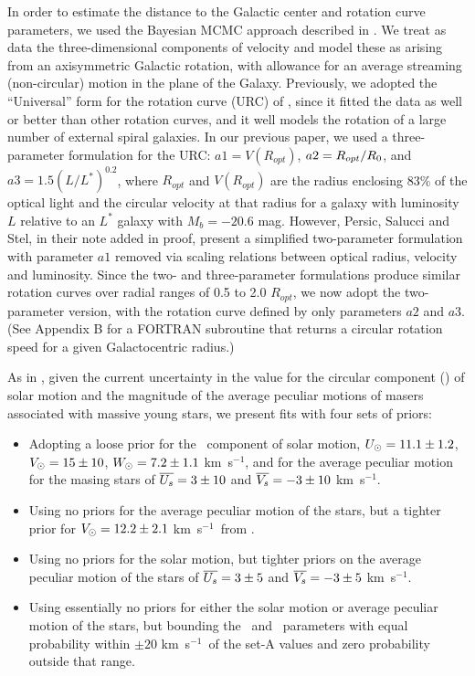 \documentclass[12pt,preprint]{aastex}
\def\kms  {km~s$^{-1}$}
\def\V     {\ifmmode {V_\odot}\else {$V_\odot$}\fi}
\def\U     {\ifmmode {U_\odot}\else {$U_\odot$}\fi}
\def\W     {\ifmmode {W_\odot}\else {$W_\odot$}\fi}
\def\Vsbar {\ifmmode {\overline{V_s}}\else {$\overline{V_s}$}\fi}
\def\Usbar {\ifmmode {\overline{U_s}}\else {$\overline{U_s}$}\fi}
\def\Ro    {\ifmmode{R_0}\else{$R_0$}\fi}
\begin{document}
In order to estimate the distance to the Galactic center and rotation curve
parameters, we used the Bayesian MCMC approach described in \citet{Reid:14}.
We treat as data the three-dimensional components of velocity and model these
as arising from an axisymmetric Galactic rotation, with allowance for an
average streaming (non-circular) motion in the plane of the Galaxy.  
Previously, we adopted the ``Universal'' form for the rotation curve (URC) 
of \citet{Persic:96}, since it fitted the data as well or better than other 
rotation curves, and it well models the rotation of a large number of external 
spiral galaxies.  In our previous paper, we used a three-parameter formulation 
for the URC: $a1=V(R_{opt})$, $a2=R_{opt}/\Ro$, and $a3=1.5(L/L^*)^{0.2}$,
where $R_{opt}$ and $V(R_{opt})$ are the radius  enclosing 83\% of the optical light
and the circular velocity at that radius for a galaxy with luminosity $L$ relative 
to an $L^*$ galaxy with $M_b = -20.6$ mag.  However, Persic, Salucci and Stel, in their 
note added in proof, present a simplified two-parameter formulation with 
parameter $a1$ removed via scaling relations between optical radius, velocity 
and luminosity.  Since the two- and three-parameter formulations produce similar 
rotation curves over radial ranges of 0.5 to 2.0 $R_{opt}$, we now adopt the 
two-parameter version, with the rotation curve defined by only parameters $a2$ 
and $a3$.  (See Appendix B for a {\footnotesize FORTRAN} subroutine that
returns a circular rotation speed for a given Galactocentric radius.)

As in \citet{Reid:14}, given the current uncertainty in the value for the circular component 
(\V) of solar motion and the magnitude of the average peculiar motions of masers
associated with massive young stars, we present fits with four sets of priors:
\begin{itemize}
\item[A)]{} Adopting a loose prior for the \V\ component of solar motion,
$\U = 11.1\pm1.2$, $\V = 15\pm10$, $\W = 7.2\pm1.1$ \kms, and for the average 
peculiar motion for the masing stars of $\Usbar = 3\pm10$ and $\Vsbar =-3\pm10$ \kms.
\item[B)]{} Using no priors for the average peculiar motion of the stars, but a 
tighter prior for $\V = 12.2\pm2.1$ \kms\ from \citet{Schoenrich:10}.
\item[C)]{} Using no priors for the solar motion, but tighter priors on the 
average peculiar motion of the stars of $\Usbar = 3\pm5$ and $\Vsbar =-3\pm5$ \kms.
\item[D)]{} Using essentially no priors for either the solar motion or 
average peculiar motion of the stars, but bounding the \V\ and \Vsbar\ parameters
with equal probability within $\pm20$ \kms\ of the set-A values and zero
probability outside that range.
\end{itemize}
\end{document}
